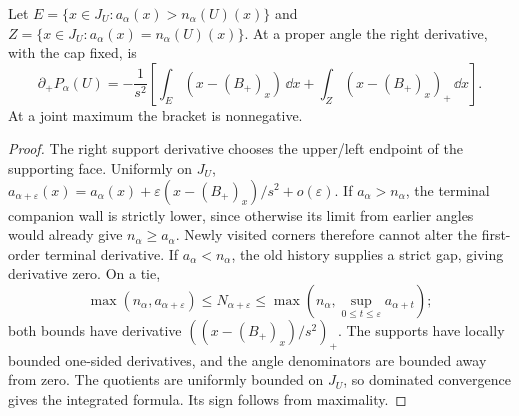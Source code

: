\begin{lemma}\label{lem:partial-angle-derivative}
Let $E=\{x\in J_U:a_\alpha(x)>n_\alpha(U)(x)\}$ and
$Z=\{x\in J_U:a_\alpha(x)=n_\alpha(U)(x)\}$.
At a proper angle the right derivative, with the cap fixed, is
\[
 \partial_+P_\alpha(U)
 =-\frac1{s^2}\left[
       \int_E(x-(B_+)_x)\,\dd x
       +\int_Z(x-(B_+)_x)_+\,\dd x\right].
\]
At a joint maximum the bracket is nonnegative.
\end{lemma}
\begin{proof}
The right support derivative chooses the upper/left endpoint of
the supporting face. Uniformly on $J_U$,
$a_{\alpha+\varepsilon}(x)=a_\alpha(x)
+\varepsilon(x-(B_+)_x)/s^2+o(\varepsilon)$.
If $a_\alpha>n_\alpha$, the terminal companion wall is strictly
lower, since otherwise its limit from earlier angles would already
give $n_\alpha\ge a_\alpha$. Newly visited corners therefore
cannot alter the first-order terminal derivative.
If $a_\alpha<n_\alpha$, the old history supplies a strict gap,
giving derivative zero. On a tie,
\[
 \max(n_\alpha,a_{\alpha+\varepsilon})\le
 N_{\alpha+\varepsilon}\le
 \max(n_\alpha,\sup_{0\le t\le\varepsilon}a_{\alpha+t});
\]
both bounds have derivative $((x-(B_+)_x)/s^2)_+$.
The supports have locally bounded one-sided derivatives, and the
angle denominators are bounded away from zero. The quotients are
uniformly bounded on $J_U$, so dominated convergence gives the
integrated formula. Its sign follows from maximality.
\end{proof}

